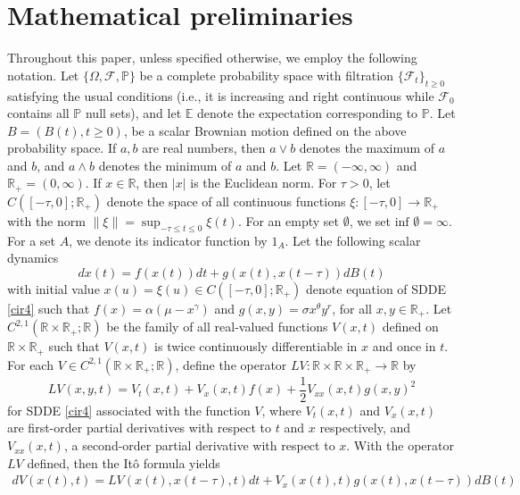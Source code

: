 \documentclass[11pt]{article}
\begin{document}
\section{ Mathematical preliminaries}\label{sect2}
Throughout this paper, unless specified otherwise, we employ the following notation. Let $\{ \Omega,\mathcal{F},\mathbb{P}\}$ be a complete probability space with filtration $\{ \mathcal{F}_t\}_{t\geq 0}$ satisfying the usual conditions (i.e., it is increasing and right continuous while $\mathcal{F}_0$ contains all $\mathbb{P}$ null sets), and let $\mathbb{E}$ denote the expectation corresponding to $\mathbb{P}$. Let $B=(B(t), t\geq 0)$, be a scalar Brownian motion defined on the above probability space. If $a,b$ are real numbers, then $a\vee b$ denotes the maximum of $a$ and $b$, and $a\wedge b$ denotes the minimum of $a$ and $b$. Let $\mathbb{R}=(-\infty,\infty)$ and $\mathbb{R}_+=(0,\infty)$. If $x\in \mathbb{R}$, then $\vert x\vert$ is the Euclidean norm. For $\tau >0$, let $C([-\tau,0];\mathbb{R}_+)$ denote the space of all continuous functions $\xi: [-\tau,0]\rightarrow \mathbb{R}_+$ with the norm $\|\xi\|=\sup_{-\tau\leq t\leq 0}\xi(t)$. For an empty set $\emptyset$, we set $\text{inf }\emptyset=\infty$. For a set $A$, we denote its indicator function by $1_A$. Let the following scalar dynamics
\begin{equation}\label{eq2:1}
dx(t)=f(x(t))dt+g(x(t),x(t-\tau))dB(t)
\end{equation}
with initial value $x(u)=\xi(u)\in C([-\tau,0];\mathbb{R}_+)$ denote equation of SDDE \eqref{cir4} such that $f(x)=\alpha(\mu-x^{\gamma})$ and $g(x,y)=\sigma x^{\theta}y^r$, for all $x,y\in \mathbb{R}_+$. Let $C^{2,1}(\mathbb{R}\times \mathbb{R}_+;\mathbb{R})$ be the family of all real-valued functions $V(x,t)$ defined on $\mathbb{R}\times \mathbb{R}_+$ such that $V(x,t)$ is twice continuously differentiable in $x$ and once in $t$.  For each $V\in C^{2,1}(\mathbb{R}\times \mathbb{R}_+;\mathbb{R})$, define the  operator $LV:\mathbb{R}\times \mathbb{R}\times \mathbb{R}_+\rightarrow \mathbb{R}$ by
\begin{equation}\label{eq2:2}
 LV(x,y,t)=V_t(x,t)+V_x(x,t)f(x)+\frac{1}{2}V_{xx}(x,t)g(x,y)^2
\end{equation}
for SDDE \eqref{cir4} associated with the function $V$, where $V_t(x,t)$ and $V_x(x,t)$  are first-order partial derivatives with respect to $t$ and $x$ respectively, and $V_{xx}(x,t)$, a second-order partial derivative with respect to $x$. With the operator $LV$ defined, then the It\^{o} formula yields
\begin{align}\label{eq2:3}
dV(x(t),t)=LV(x(t),x(t-\tau),t)dt+V_x(x(t),t)g(x(t),x(t-\tau))dB(t)
\end{align}
\end{document}
